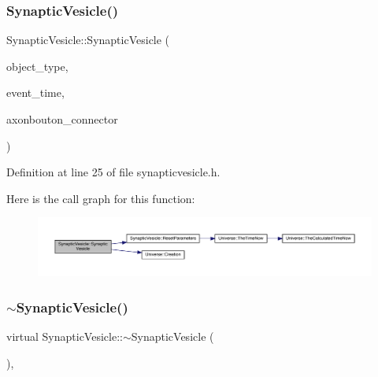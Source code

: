 \subsubsection{\texorpdfstring{Synaptic\+Vesicle()}{SynapticVesicle()}\hspace{0.1cm}{\footnotesize\ttfamily [4/4]}}
{\footnotesize\ttfamily Synaptic\+Vesicle\+::\+Synaptic\+Vesicle (\begin{DoxyParamCaption}\item[{unsigned int}]{object\+\_\+type,  }\item[{std\+::chrono\+::time\+\_\+point$<$ \hyperlink{universe_8h_a0ef8d951d1ca5ab3cfaf7ab4c7a6fd80}{Clock} $>$}]{event\+\_\+time,  }\item[{\hyperlink{class_axon_bouton}{Axon\+Bouton} \&}]{axonbouton\+\_\+connector }\end{DoxyParamCaption})\hspace{0.3cm}{\ttfamily [inline]}}



Definition at line 25 of file synapticvesicle.\+h.

Here is the call graph for this function\+:
\nopagebreak
\begin{figure}[H]
\begin{center}
\leavevmode
\includegraphics[width=350pt]{class_synaptic_vesicle_a0f86278b771137978d03bb6cf460a527_cgraph}
\end{center}
\end{figure}
\mbox{\label{class_synaptic_vesicle_a9bbc23a1c9757d8522a10bb28e0f575b}} 
\subsubsection{\texorpdfstring{$\sim$\+Synaptic\+Vesicle()}{~SynapticVesicle()}}
{\footnotesize\ttfamily virtual Synaptic\+Vesicle\+::$\sim$\+Synaptic\+Vesicle (\begin{DoxyParamCaption}{ }\end{DoxyParamCaption})\hspace{0.3cm}{\ttfamily [inline]}, {\ttfamily [virtual]}}

